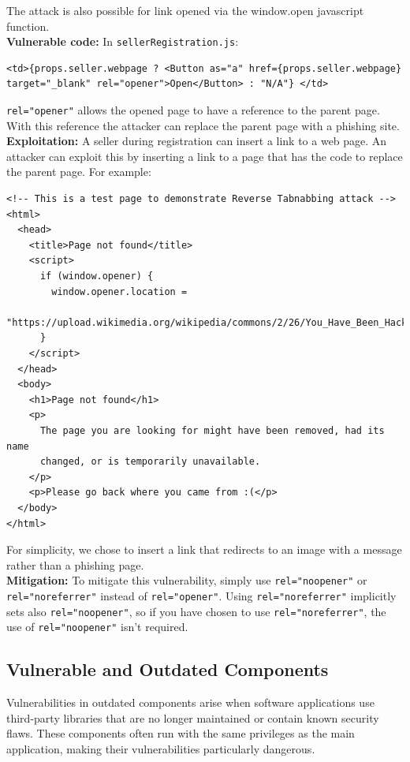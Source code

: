 \documentclass[]{article}
\begin{document}
The attack is also possible for link opened via the window.open javascript function.
\\ \textbf{Vulnerable code:} In \texttt{sellerRegistration.js}:
\begin{lstlisting}
<td>{props.seller.webpage ? <Button as="a" href={props.seller.webpage} target="_blank" rel="opener">Open</Button> : "N/A"} </td>
\end{lstlisting}
\texttt{rel="opener"} allows the opened page to have a reference to the parent page. With this reference the attacker can replace the parent page with a phishing site.
\\ \textbf{Exploitation:} A seller during registration can insert a link to a web page. An attacker can exploit this by inserting a link to a page that has the code to replace the parent page. For example:
\begin{lstlisting}
<!-- This is a test page to demonstrate Reverse Tabnabbing attack -->
<html>
  <head>
    <title>Page not found</title>
    <script>
      if (window.opener) {
        window.opener.location =
          "https://upload.wikimedia.org/wikipedia/commons/2/26/You_Have_Been_Hacked%21.jpg";
      }
    </script>
  </head>
  <body>
    <h1>Page not found</h1>
    <p>
      The page you are looking for might have been removed, had its name
      changed, or is temporarily unavailable.
    </p>
    <p>Please go back where you came from :(</p>
  </body>
</html>
\end{lstlisting}
For simplicity, we chose to insert a link that redirects to an image with a message rather than a phishing page.
\\ \textbf{Mitigation:} To mitigate this vulnerability, simply use \texttt{rel="noopener"} or \texttt{rel="noreferrer"} instead of \texttt{rel="opener"}. Using \texttt{rel="noreferrer"} implicitly sets also \texttt{rel="noopener"}, so if you have chosen to use \texttt{rel="noreferrer"}, the use of \texttt{rel="noopener"} isn’t required.

\subsection{Vulnerable and Outdated Components}

Vulnerabilities in outdated components arise when software applications use third-party libraries that are no longer maintained or contain known security flaws. These components often run with the same privileges as the main application, making their vulnerabilities particularly dangerous.
\end{document}
